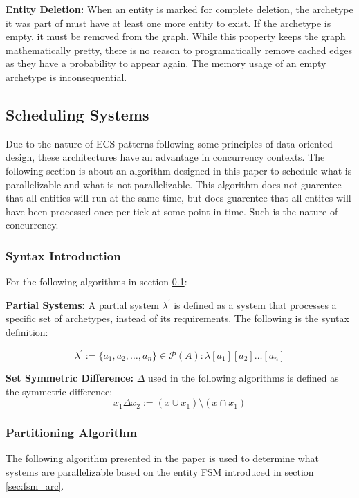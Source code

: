 \textbf{Entity Deletion: } When an entity is marked for complete deletion, the archetype it was part of must have at least one more entity to exist. If the archetype is empty, it must be removed from the graph. While this property keeps the graph mathematically pretty, there is no reason to programatically remove cached edges as they have a probability to appear again. The memory usage of an empty archetype is inconsequential. 

\subsection{Scheduling Systems}
\label{sec:scheduling}

Due to the nature of ECS patterns following some principles of data-oriented design, these architectures have an advantage in concurrency contexts. The following section is about an algorithm designed in this paper to schedule what is parallelizable and what is not parallelizable. This algorithm does not guarentee that all entities will run at the same time, but does guarentee that all entites will have been processed once per tick at some point in time. Such is the nature of concurrency. 

\subsubsection{Syntax Introduction}
For the following algorithms in section \ref{sec:scheduling}:

\textbf{Partial Systems:} A partial system $\lambda^\prime$ is defined as a system that processes a specific set of archetypes, instead of its requirements. The following is the syntax definition:

\begin{equation}
    \lambda^\prime := \{a_1,a_2,\ldots,a_n\} \in \mathcal{P}(A) : \lambda[a_1][a_2]\ldots[a_n]
    \label{eq:partial_lambda}
\end{equation}

\textbf{Set Symmetric Difference:} $\Delta$ used in the following algorithms is defined as the symmetric difference: 
$$x_1 \Delta x_2 := (x \cup x_1) \setminus (x \cap x_1)$$

\subsubsection{Partitioning Algorithm}
\label{alg:part}
The following algorithm presented in the paper is used to determine what systems are parallelizable based on the entity FSM introduced in section \ref{sec:fsm_arc}. 

